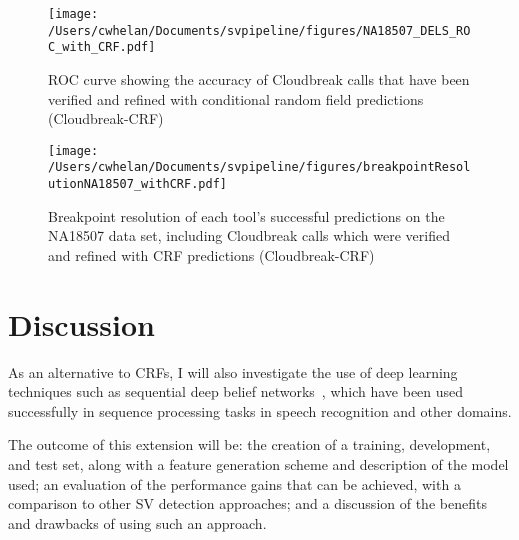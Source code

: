 \begin{figure}
\centering
\texttt{[image: /Users/cwhelan/Documents/svpipeline/figures/NA18507\_DELS\_ROC\_with\_CRF.pdf]}
\caption{ROC curve showing the accuracy of Cloudbreak calls that have been verified and refined with conditional random field predictions (Cloudbreak-CRF)}
\label{roc_NA18507_with_crf}
\end{figure}

\begin{figure}
\centering
\texttt{[image: /Users/cwhelan/Documents/svpipeline/figures/breakpointResolutionNA18507\_withCRF.pdf]}
\caption{Breakpoint resolution of each tool's successful predictions on the NA18507 data set, including Cloudbreak calls which were verified and refined with CRF predictions (Cloudbreak-CRF)}
\label{breakpoint_resolution_NA18507_with_crf}
\end{figure}

\section{Discussion}

As an alternative to CRFs, I will also investigate the use of deep learning techniques such as sequential deep belief networks~\cite{andrew2012:sdbn}, which have been used successfully in sequence processing tasks in speech recognition and other domains.

The outcome of this extension will be: the creation of a training, development, and test set, along with a feature generation scheme and description of the model used; an evaluation of the performance gains that can be achieved, with a comparison to other SV detection approaches; and a discussion of the benefits and drawbacks of using such an approach.
